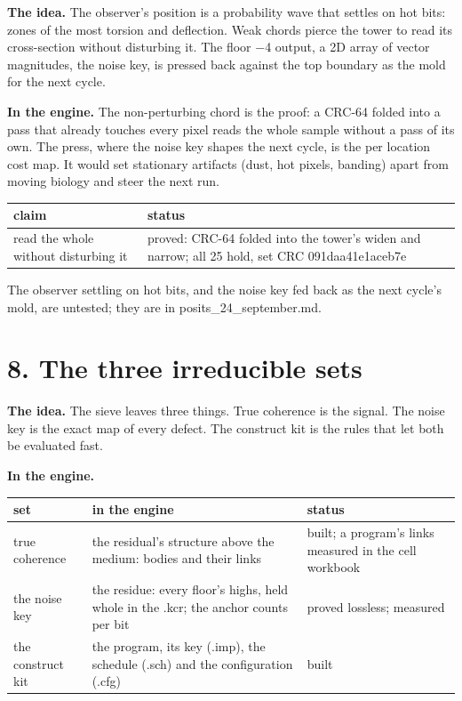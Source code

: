 \textbf{The idea.} The observer's position is a probability wave that settles on hot bits: zones of the most torsion and deflection. Weak chords pierce the tower to read its cross-section without disturbing it. The floor −4 output, a 2D array of vector magnitudes, the noise key, is pressed back against the top boundary as the mold for the next cycle.

\textbf{In the engine.} The non-perturbing chord is the proof: a CRC-64 folded into a pass that already touches every pixel reads the whole sample without a pass of its own. The press, where the noise key shapes the next cycle, is the per location cost map. It would set stationary artifacts (dust, hot pixels, banding) apart from moving biology and steer the next run.

{\small
\setlength{\tabcolsep}{6pt}
\begin{longtable}{>{\RaggedRight\arraybackslash}p{}>{\RaggedRight\arraybackslash}p{}}
\toprule
claim & status \\
\midrule
\endhead
read the whole without disturbing it & proved: CRC-64 folded into the tower's widen and narrow; all 25 hold, set CRC 091daa41e1aceb7e \\
\bottomrule
\end{longtable}
}

The observer settling on hot bits, and the noise key fed back as the next cycle's mold, are untested; they are in posits\_\allowbreak{}24\_\allowbreak{}september.md.

\section{\texorpdfstring{8. The three irreducible sets}{8. The three irreducible sets}}

\textbf{The idea.} The sieve leaves three things. True coherence is the signal. The noise key is the exact map of every defect. The construct kit is the rules that let both be evaluated fast.

\textbf{In the engine.}

{\small
\setlength{\tabcolsep}{6pt}
\begin{longtable}{>{\RaggedRight\arraybackslash}p{}>{\RaggedRight\arraybackslash}p{}>{\RaggedRight\arraybackslash}p{}}
\toprule
set & in the engine & status \\
\midrule
\endhead
true coherence & the residual's structure above the medium: bodies and their links & built; a program's links measured in the cell workbook \\
the noise key & the residue: every floor's highs, held whole in the .kcr; the anchor counts per bit & proved lossless; measured \\
the construct kit & the program, its key (.imp), the schedule (.sch) and the configuration (.cfg) & built \\
\bottomrule
\end{longtable}
}

